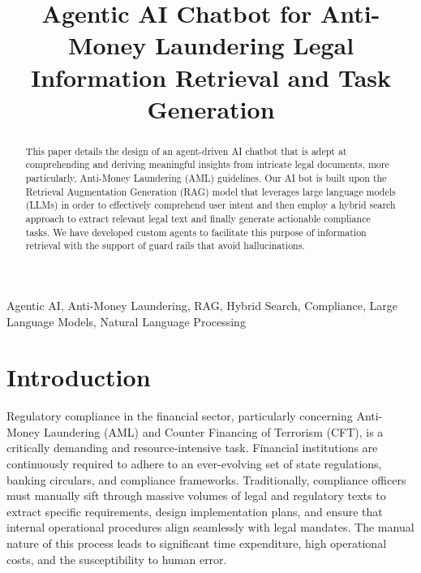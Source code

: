 ﻿\documentclass[conference]{IEEEtran}
\begin{document}
\title{Agentic AI Chatbot for Anti-Money Laundering Legal Information Retrieval and Task Generation}

\author{
\and
{}
\and
{}
}

\maketitle

\begin{abstract}
This paper details the design of an agent-driven AI chatbot that is adept at comprehending and deriving meaningful insights from intricate legal documents, more particularly, Anti-Money Laundering (AML) guidelines. Our AI bot is built upon the Retrieval Augmentation Generation (RAG) model that leverages large language models (LLMs) in order to effectively comprehend user intent and then employ a hybrid search approach to extract relevant legal text and finally generate actionable compliance tasks. We have developed custom agents to facilitate this purpose of information retrieval with the support of guard rails that avoid hallucinations.
\end{abstract}

\begin{IEEEkeywords}
Agentic AI, Anti-Money Laundering, RAG, Hybrid Search, Compliance, Large Language Models, Natural Language Processing
\end{IEEEkeywords}

\section{Introduction}
Regulatory compliance in the financial sector, particularly concerning Anti-Money Laundering (AML) and Counter Financing of Terrorism (CFT), is a critically demanding and resource-intensive task. Financial institutions are continuously required to adhere to an ever-evolving set of state regulations, banking circulars, and compliance frameworks. Traditionally, compliance officers must manually sift through massive volumes of legal and regulatory texts to extract specific requirements, design implementation plans, and ensure that internal operational procedures align seamlessly with legal mandates. The manual nature of this process leads to significant time expenditure, high operational costs, and the susceptibility to human error.
\end{document}
